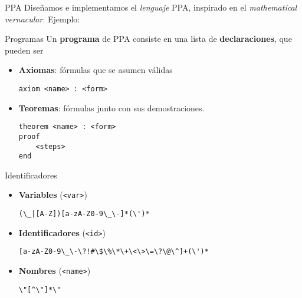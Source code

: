\documentclass[xcolor={dvipsnames},spanish]{beamer}
\begin{document}

\begin{frame}[fragile]{PPA}
    Diseñamos e implementamos el \textit{lenguaje} PPA, inspirado en el
    \textit{mathematical vernacular}. Ejemplo:
    
\end{frame}

\begin{frame}[fragile]{Programas}
    Un \textbf{programa} de PPA consiste en una lista de \textbf{declaraciones},
    que pueden ser
    \begin{itemize}
        \item \textbf{Axiomas}: fórmulas que se asumen válidas
        \begin{lstlisting}[numbers=none]
axiom <name> : <form>
        \end{lstlisting}
        \item \textbf{Teoremas}: fórmulas junto con sus demostraciones.
\begin{lstlisting}[numbers=none]
theorem <name> : <form>
proof
    <steps>
end
\end{lstlisting}
    \end{itemize}
\end{frame}

\begin{frame}[fragile]{Identificadores}
    \begin{itemize}
        \item \textbf{Variables} (\lstinline{<var>})
        \begin{center}
            \verb/(\_|[A-Z])[a-zA-Z0-9\_\-]*(\')*/
        \end{center}
        \item \textbf{Identificadores} (\lstinline{<id>})
        \begin{center}
            \verb/[a-zA-Z0-9\_\-\?!#\$\%\*\+\<\>\=\?\@\^]+(\')*/
        \end{center}
        \item \textbf{Nombres} (\lstinline{<name>}) 
        \begin{center}
            \verb/\"[^\"]*\"/
        \end{center}
    \end{itemize}
\end{frame}
\end{document}
